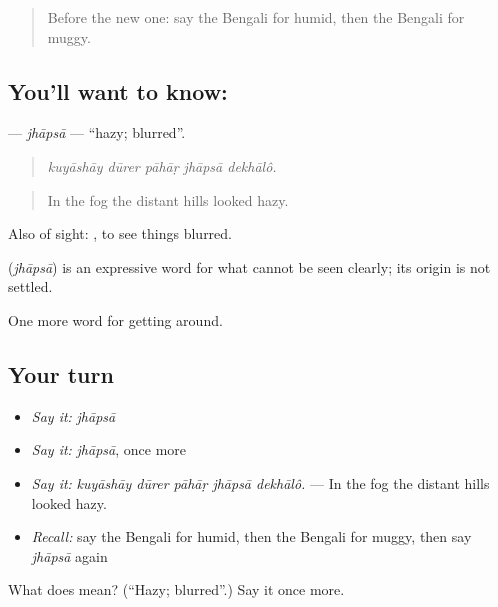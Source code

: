 \begin{quote}
Before the new one: say the Bengali for humid, then the Bengali for muggy.
\end{quote}

\subsection*{You'll want to know: }
\textbf{} — \emph{jhāpsā} — \textquotedblleft{}hazy; blurred\textquotedblright{}.

\begin{quote}
    
\end{quote}

\begin{quote}
\emph{kuyāshāy dūrer pāhāṛ jhāpsā dekhālô.}
\end{quote}

\begin{quote}
In the fog the distant hills looked hazy.
\end{quote}

Also of sight:   , to see things blurred.

\begin{cousinweb}
\textbf{} (\emph{jhāpsā}) is an expressive word for what cannot be seen clearly; its origin is not settled.
\end{cousinweb}

\begin{grammarlens}[title={What you've built}]
One more word for getting around.
\end{grammarlens}

\subsection*{Your turn}
\begin{itemize}
\raggedright
  \item \emph{Say it:} \emph{jhāpsā}
  \item \emph{Say it:} \emph{jhāpsā}, once more
  \item \emph{Say it:} \emph{kuyāshāy dūrer pāhāṛ jhāpsā dekhālô.} — In the fog the distant hills looked hazy.
  \item \emph{Recall:} say the Bengali for humid, then the Bengali for muggy, then say \emph{jhāpsā} again
\end{itemize}

\begin{tcolorbox}[breakable,colback=teal!4,colframe=teal!35!black,title={Before you move on}]
What does  mean? (\textquotedblleft{}Hazy; blurred\textquotedblright{}.) Say it once more.
\end{tcolorbox}
